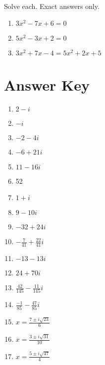 Solve each. Exact answers only.

\begin{multicols}{3}
\begin{enumerate}		\setcounter{enumi}{\value{Review}}
	\item $3x^2-7x+6=0$
	\item $5x^2-3x+2=0$
	\item $3x^2+7x-4=5x^2+2x+5$
\end{enumerate}	\setcounter{Review}{\value{enumi}}
\end{multicols}


\newpage

\section{Answer Key}

\begin{enumerate}
	\item $2-i$
    \item $-i$
    \item $-2-4i$
    \item $-6+21i$
    \item $11-16i$
    \item 52
    \item $1 + i$
    \item $9-10i$
    \item $-32+24i$
    \item $-\frac{7}{41}+\frac{22}{41}i$
    \item $-13-13i$
    \item $24+70i$
    \item $\frac{42}{145}-\frac{11}{145}i$
    \item $\frac{-1}{85}-\frac{47}{85}i$
    
    
    \item $x = \frac{7 \pm i\sqrt{23}}{6}$
    \item $x = \frac{3 \pm i \sqrt{31}}{10}$
    \item $x = \frac{5 \pm i\sqrt{47}}{4}$
\end{enumerate}